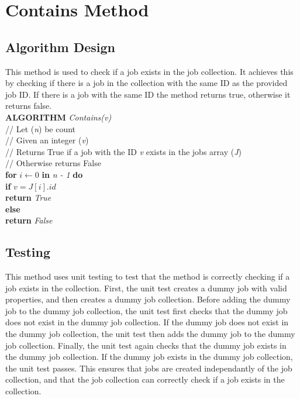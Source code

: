\documentclass[12pt,a4paper]{article}
\begin{document}
	\newpage

	\section{Contains Method}
		\subsection{Algorithm Design}
			This method is used to check if a job exists in the job collection. It achieves this by 
			checking if there is a job in the collection with the same ID as the provided job ID. If there is 
			a job with the same ID the method returns true, otherwise it returns false.\\

			\textbf{ALGORITHM} \textit{Contains(v)}\\
			\null\hspace{1cm}// Let (\textit{n}) be count\\
			\null\hspace{1cm}// Given an integer (\textit{v})\\
			\null\hspace{1cm}// Returns True if a job with the ID \textit{v} exists in the jobs array (\textit{J})\\
			\null\hspace{1cm}// Otherwise returns False\\
			\null\hspace{1cm}\textbf{for} \textit{$i \gets 0$} \textbf{in} \textit{n - 1} \textbf{do}\\
			\null\hspace{2cm}\textbf{if} \textit{$v = J[i].id$}\\
			\null\hspace{3cm}\textbf{return} \textit{True}\\
			\null\hspace{1cm}\textbf{else}\\
			\null\hspace{2cm}\textbf{return} \textit{False}
			
		\subsection{Testing}
			This method uses unit testing to test that the method is correctly checking if a job exists in 
			the collection. First, the unit test creates a dummy job with valid properties, and then creates 
			a dummy job collection. Before adding the dummy job to the dummy job collection, the unit test 
			first checks that the dummy job does not exist in the dummy job collection. If the dummy job 
			does not exist in the dummy job collection, the unit test then adds the dummy job to the dummy 
			job collection. Finally, the unit test again checks that the dummy job exists in the dummy job 
			collection. If the dummy job exists in the dummy job collection, the unit test passes. This 
			ensures that jobs are created independantly of the job collection, and that the job collection 
			can correctly check if a job exists in the collection.\\
\end{document}
